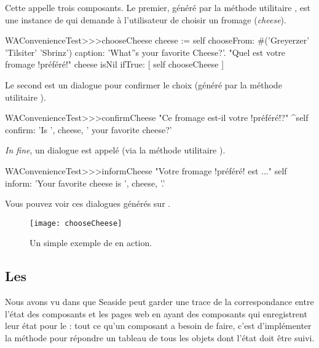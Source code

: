 \documentclass[a4paper,10pt,twoside]{book}
\begin{document}
Cette \task appelle trois composants.
Le premier, généré par la méthode utilitaire
, est une instance de
 qui demande à l'utilisateur de choisir un
fromage (\emph{cheese}).

\begin{code}{}
WAConvenienceTest>>>chooseCheese
	cheese := self
		chooseFrom: #('Greyerzer' 'Tilsiter' 'Sbrinz')
		caption: 'What''s your favorite Cheese?'. "Quel est votre fromage !préféré!"
	cheese isNil ifTrue: [ self chooseCheese ]
\end{code}


Le second est un dialogue  pour confirmer le
choix (généré par la méthode utilitaire ).

\begin{code}{}
WAConvenienceTest>>>confirmCheese
    "Ce fromage est-il votre !préféré!?"
	^self confirm: 'Is ', cheese,  ' your favorite cheese?'
\end{code}

\emph{In fine}, un dialogue  est appelé (via la
méthode utilitaire ).

\begin{code}{}
WAConvenienceTest>>>informCheese
    "Votre fromage !préféré! est ..."
	self inform: 'Your favorite cheese is ', cheese, '.'
\end{code}

Vous pouvez voir ces dialogues générés sur .

\begin{figure}[ht]
\begin{center}
\texttt{[image: chooseCheese]}
\caption{Un simple exemple de \task en action.}
\end{center}
\end{figure}

\subsection{Les \transactions} %

Nous avons vu dans  que Seaside peut garder une
trace de la correspondance entre l'état des composants et les pages
web en ayant des composants qui enregistrent leur état pour le
\backtracking:
tout ce qu'un composant a besoin de faire, c'est d'implémenter la
méthode  pour répondre un tableau de tous les objets dont
l'état doit être suivi.
\end{document}
